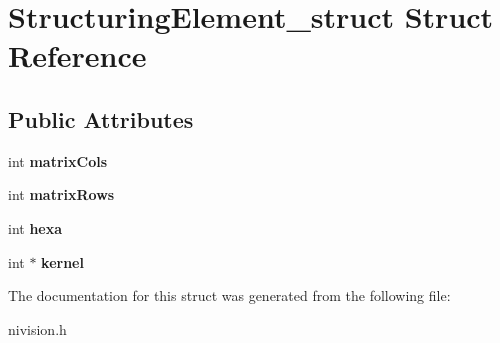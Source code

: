\hypertarget{structStructuringElement__struct}{
\section{StructuringElement\_\-struct Struct Reference}
\label{structStructuringElement__struct}
}
\subsection*{Public Attributes}
\begin{DoxyCompactItemize}
\item 
\hypertarget{structStructuringElement__struct_a2a1dfb5e78b8edf36937e7b2ca37db0c}{
int {\bfseries matrixCols}}
\label{structStructuringElement__struct_a2a1dfb5e78b8edf36937e7b2ca37db0c}

\item 
\hypertarget{structStructuringElement__struct_a210809c7dc619889f7fe99866504ba05}{
int {\bfseries matrixRows}}
\label{structStructuringElement__struct_a210809c7dc619889f7fe99866504ba05}

\item 
\hypertarget{structStructuringElement__struct_ad913f2140d6dacce145a54da29397ec3}{
int {\bfseries hexa}}
\label{structStructuringElement__struct_ad913f2140d6dacce145a54da29397ec3}

\item 
\hypertarget{structStructuringElement__struct_abdf639de105fa81786327fc096f222df}{
int $\ast$ {\bfseries kernel}}
\label{structStructuringElement__struct_abdf639de105fa81786327fc096f222df}

\end{DoxyCompactItemize}


The documentation for this struct was generated from the following file:\begin{DoxyCompactItemize}
\item 
nivision.h\end{DoxyCompactItemize}

